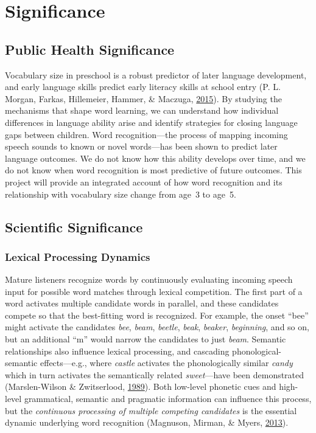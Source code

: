 \documentclass [11pt, proquest] {uwthesis}[2015/03/03]
\begin{document}
\chapter{Significance}\label{significance}

\section{Public Health Significance}\label{public-health-significance}

Vocabulary size in preschool is a robust predictor of later language
development, and early language skills predict early literacy skills at
school entry (P. L. Morgan, Farkas, Hillemeier, Hammer, \& Maczuga,
\protect\hyperlink{ref-Morgan2015}{2015}). By studying the mechanisms
that shape word learning, we can understand how individual differences
in language ability arise and identify strategies for closing language
gaps between children. Word recognition---the process of mapping
incoming speech sounds to known or novel words---has been shown to
predict later language outcomes. We do not know how this ability
develops over time, and we do not know when word recognition is most
predictive of future outcomes. This project will provide an integrated
account of how word recognition and its relationship with vocabulary
size change from age~3 to age~5.

\section{Scientific Significance}\label{scientific-significance}

\subsection{Lexical Processing
Dynamics}\label{lexical-processing-dynamics}

Mature listeners recognize words by continuously evaluating incoming
speech input for possible word matches through lexical competition. The
first part of a word activates multiple candidate words in parallel, and
these candidates compete so that the best-fitting word is recognized.
For example, the onset ``bee'' might activate the candidates \emph{bee},
\emph{beam}, \emph{beetle}, \emph{beak}, \emph{beaker},
\emph{beginning}, and so on, but an additional ``m'' would narrow the
candidates to just \emph{beam}. Semantic relationships also influence
lexical processing, and cascading phonological-semantic effects---e.g.,
where \emph{castle} activates the phonologically similar \emph{candy}
which in turn activates the semantically related \emph{sweet}---have
been demonstrated (Marslen-Wilson \& Zwitserlood,
\protect\hyperlink{ref-Marslen-Wilson1989}{1989}). Both low-level
phonetic cues and high-level grammatical, semantic and pragmatic
information can influence this process, but the \emph{continuous
processing of multiple competing candidates} is the essential dynamic
underlying word recognition (Magnuson, Mirman, \& Myers,
\protect\hyperlink{ref-Magnuson2013}{2013}).
\end{document}
